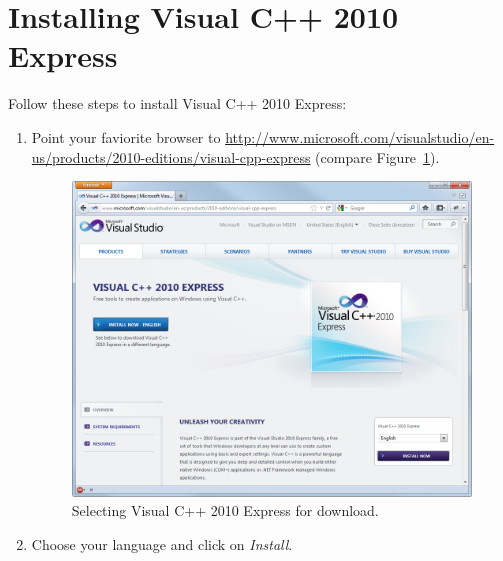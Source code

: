 %
% 
%
%
%
%

\section{Installing Visual C++ 2010 Express}
\label{appx:install_vs}

Follow these steps to install Visual C++ 2010 Express:

\begin{enumerate}
	\item Point your faviorite browser to
		\url{http://www.microsoft.com/visualstudio/en-us/products/2010-editions/visual-cpp-express}
		(compare Figure~\ref{fig:setup_vs_download1}).

\begin{figure}[htbp]
	\centering
	\includegraphics[scale=0.45]{figures/PNG/setup_vs_download1.png}
	\caption{Selecting Visual C++ 2010 Express for download.}
	\label{fig:setup_vs_download1}
\end{figure}

	\item Choose your language and click on \emph{Install}.
	

\end{enumerate}
